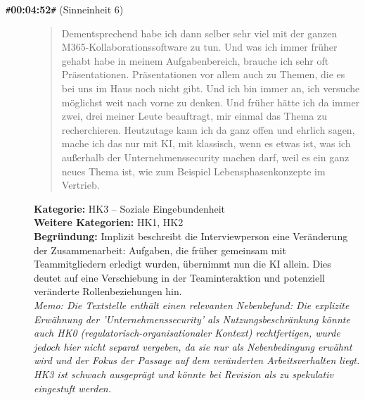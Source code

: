 \begin{description}
  \item[\texttt{\#}\textbf{00:04:52}\texttt{\#} (Sinneinheit 6)]
  \begin{quote}
  Dementsprechend habe ich dann selber sehr viel mit der ganzen M365-Kollaborationssoftware zu tun. Und was ich immer früher gehabt habe in meinem Aufgabenbereich, brauche ich sehr oft Präsentationen. Präsentationen vor allem auch zu Themen, die es bei uns im Haus noch nicht gibt. Und ich bin immer an, ich versuche möglichst weit nach vorne zu denken. Und früher hätte ich da immer zwei, drei meiner Leute beauftragt, mir einmal das Thema zu recherchieren. Heutzutage kann ich da ganz offen und ehrlich sagen, mache ich das nur mit KI, mit klassisch, wenn es etwas ist, was ich außerhalb der Unternehmenssecurity machen darf, weil es ein ganz neues Thema ist, wie zum Beispiel Lebensphasenkonzepte im Vertrieb.
  \end{quote}
  \textbf{Kategorie:} HK3 -- Soziale Eingebundenheit\\
  \textbf{Weitere Kategorien:} HK1, HK2\\
  \textbf{Begr\"undung:} Implizit beschreibt die Interviewperson eine Veränderung der Zusammenarbeit: Aufgaben, die früher gemeinsam mit Teammitgliedern erledigt wurden, übernimmt nun die KI allein. Dies deutet auf eine Verschiebung in der Teaminteraktion und potenziell veränderte Rollenbeziehungen hin.
  \\\textit{Memo: Die Textstelle enthält einen relevanten Nebenbefund: Die explizite Erwähnung der 'Unternehmenssecurity' als Nutzungsbeschränkung könnte auch HK0 (regulatorisch-organisationaler Kontext) rechtfertigen, wurde jedoch hier nicht separat vergeben, da sie nur als Nebenbedingung erwähnt wird und der Fokus der Passage auf dem veränderten Arbeitsverhalten liegt. HK3 ist schwach ausgeprägt und könnte bei Revision als zu spekulativ eingestuft werden.}
\end{description}
\medskip

